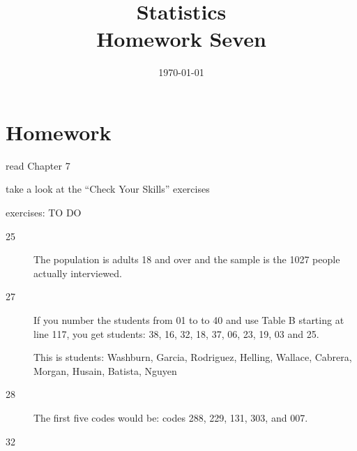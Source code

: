 \documentclass[letterpaper, landscape]{exam}
\title{Statistics \\ Homework Seven}
\date{\today}
\author{}
\begin{document}
  \maketitle

  \section{Homework}
    \begin{itemize*}
      \item read Chapter 7 
      \item take a look at the ``Check Your Skills'' exercises
      \item exercises: TO DO
    \end{itemize*}

  \ifprintanswers
    \begin{description}

      \item[25] The population is adults 18 and over and the sample is the 1027
        people actually interviewed.

      \item[27] If you number the students from 01 to to 40 and use Table B
        starting at line 117, you get students: 38, 16, 32, 18, 37, 06, 23,
        19, 03 and 25.

        This is students: Washburn, Garcia, Rodriguez, Helling, Wallace,
        Cabrera, Morgan, Husain, Batista, Nguyen

      \item[28] The first five codes would be: codes 288, 229, 131, 303, and 007.

      \item[32] 


\end{description}
\end{document}
